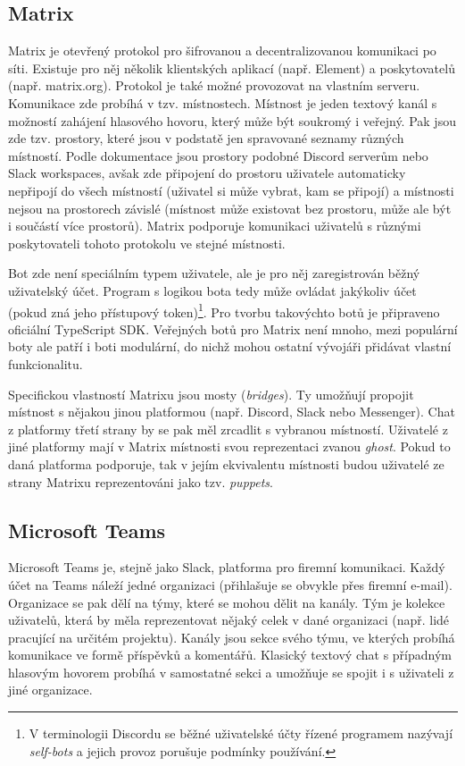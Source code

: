 \documentclass[FM]{tulthesis}
\begin{document}
	\subsection{Matrix}
	
	Matrix je otevřený protokol pro šifrovanou a decentralizovanou komunikaci po síti. Existuje pro něj několik klientských aplikací (např. Element) a poskytovatelů (např. matrix.org). Protokol je také možné provozovat na vlastním serveru. Komunikace zde probíhá v tzv. místnostech. Místnost je jeden textový kanál s možností zahájení hlasového hovoru, který může být soukromý i veřejný. Pak jsou zde tzv. prostory, které jsou v podstatě jen spravované seznamy různých místností. Podle dokumentace jsou prostory podobné Discord serverům nebo Slack workspaces, avšak zde připojení do prostoru uživatele automaticky nepřipojí do všech místností (uživatel si může vybrat, kam se připojí) a místnosti nejsou na prostorech závislé (místnost může existovat bez prostoru, může ale být i součástí více prostorů). Matrix podporuje komunikaci uživatelů s různými poskytovateli tohoto protokolu ve stejné místnosti.
	
	Bot zde není speciálním typem uživatele, ale je pro něj zaregistrován běžný uživatelský účet. Program s logikou bota tedy může ovládat jakýkoliv účet (pokud zná jeho přístupový token)\footnote{V terminologii Discordu se běžné uživatelské účty řízené programem nazývají \textit{self-bots} a jejich provoz porušuje podmínky používání.}. Pro tvorbu takovýchto botů je připraveno oficiální \mbox{TypeScript} SDK. Veřejných botů pro Matrix není mnoho, mezi populární boty ale patří i boti modulární, do nichž mohou ostatní vývojáři přidávat vlastní funkcionalitu.
	
	Specifickou vlastností Matrixu jsou mosty (\textit{bridges}). Ty umožňují propojit místnost s nějakou jinou platformou (např. Discord, Slack nebo Messenger). Chat z platformy třetí strany by se pak měl zrcadlit s vybranou místností. Uživatelé z jiné platformy mají v Matrix místnosti svou reprezentaci zvanou \textit{ghost}. Pokud to daná platforma podporuje, tak v jejím ekvivalentu místnosti budou uživatelé ze strany Matrixu reprezentováni jako tzv. \textit{puppets}. \cite{doc_Matrix}
	
	\subsection{Microsoft Teams}
	
	Microsoft Teams je, stejně jako Slack, platforma pro firemní komunikaci. Každý účet na Teams náleží jedné organizaci (přihlašuje se obvykle přes firemní e-mail). Organizace se pak dělí na týmy, které se mohou dělit na kanály. Tým je kolekce uživatelů, která by měla reprezentovat nějaký celek v dané organizaci (např. lidé pracující na určitém projektu). Kanály jsou sekce svého týmu, ve kterých probíhá komunikace ve formě příspěvků a komentářů. Klasický textový chat s případným hlasovým hovorem probíhá v samostatné sekci a umožňuje se spojit i s uživateli z jiné organizace.
	
\end{document}
